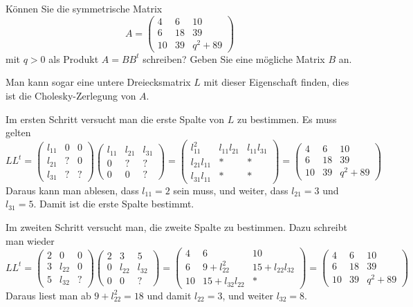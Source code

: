 Können Sie die symmetrische Matrix
\[
A=\begin{pmatrix}
 4& 6&10\\
 6&18&39\\
10&39&q^2 + 89
\end{pmatrix}
\]
mit $q>0$ als Produkt $A=BB^t$ schreiben?
Geben Sie eine mögliche Matrix $B$ an.


\begin{loesung}
Man kann sogar eine untere Dreiecksmatrix $L$ mit dieser Eigenschaft finden,
dies ist die Cholesky-Zerlegung von $A$.

Im ersten Schritt versucht man die erste Spalte von $L$ zu bestimmen.
Es muss gelten
\[
LL^t=
\begin{pmatrix}
l_{11}&  0&  0\\
l_{21}&  ?&  0\\
l_{31}&  ?&  ?
\end{pmatrix}
\begin{pmatrix}
l_{11}&l_{21}&l_{31}\\
     0&     ?&     ?\\
     0&     0&     ?
\end{pmatrix}
=
\begin{pmatrix}
    l_{11}^2&l_{11}l_{21}&l_{11}l_{31}\\
l_{21}l_{11}&           *&           *\\
l_{31}l_{11}&           *&           *
\end{pmatrix}
=
\begin{pmatrix}
 4& 6&10\\
 6&18&39\\
10&39&q^2 + 89
\end{pmatrix}
\]
Daraus kann man ablesen, dass $l_{11}=2$ sein muss, und weiter,
dass
$l_{21}=3$ und $l_{31}=5$. Damit ist die erste Spalte bestimmt.

Im zweiten Schritt versucht man, die zweite Spalte zu bestimmen.
Dazu schreibt man wieder
\[
LL^t
=
\begin{pmatrix}
2&     0&0\\
3&l_{22}&0\\
5&l_{32}&?
\end{pmatrix}
\begin{pmatrix}
2&     3&     5\\
0&l_{22}&l_{32}\\
0&     0&?
\end{pmatrix}
=
\begin{pmatrix}
 4&              6&            10\\
 6& 9+l_{22}^2    &15+l_{22}l_{32}\\
10&15+l_{32}l_{22}&             *
\end{pmatrix}
=
\begin{pmatrix}
 4& 6&10\\
 6&18&39\\
10&39& q^2 + 89
\end{pmatrix}
\]
Daraus liest man ab $9+l_{22}^2=18$ und damit $l_{22}=3$, und weiter
$l_{32}=8$.


\end{loesung}
